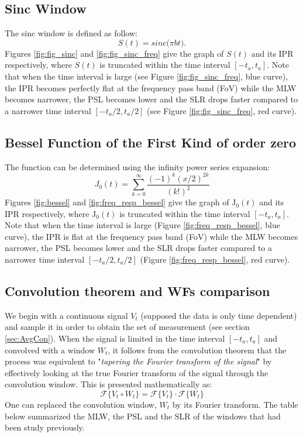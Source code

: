 \documentclass[useAMS,usenatbib]{mn2e}
\begin{document}
\subsection{Sinc Window}
The sinc window is defined as follow:
\begin{equation}
S(t)= sinc\big(\pi b t\big).
\end{equation}
 Figures \ref{fig:fig_sinc} and \ref{fig:fig_sinc_freq} give the graph of $S(t)$ and its IPR respectively, where 
$S(t)$ is truncated within the time interval $[-t_a,t_a]$. Note that when the time interval is large 
(see Figure \ref{fig:fig_sinc_freq}, blue curve), the IPR becomes perfectly flat at the frequency pass band (FoV) while the MLW becomes 
narrower,  the PSL 
becomes lower and the SLR drops faster compared to a narrower time interval $[-t_a/2,t_a/2]$ (see Figure \ref{fig:fig_sinc_freq}, red 
curve). 
\subsection{Bessel Function of the First Kind of order zero}
 The function can  be determined using the infinity power series expansion:
\begin{equation}
J_0(t) = \sum_{k=0}^{\infty}\frac{(-1)^k (x/2)^{2k}}{(k!)^2}
\end{equation}
 Figures \ref{fig:bessel} and  \ref{fig:freq_resp_bessel} give the graph of J$_0(t)$ and its IPR respectively, where 
J$_0(t)$ is truncated within the time interval $[-t_a,t_a]$. Note that when the time interval is large 
(Figure \ref{fig:freq_resp_bessel}, blue curve), the IPR is flat at the frequency pass band (FoV) while the MLW becomes narrower,  the PSL 
becomes lower and the SLR drops faster compared to a narrower time interval $[-t_a/2,t_a/2]$ (Figure \ref{fig:freq_resp_bessel}, red curve).
\subsection{Convolution theorem and WFs comparison}
We begin with a continuous signal $V_{t}$ (supposed the data is only time dependent) and sample it in order to obtain the set of 
measurement (see section \ref{sec:AvgCon}). When the signal is limited in the time interval $[-t_a,t_a]$ and convolved with a window 
$W_{t}$, it 
follows from the convolution theorem that the process was equivalent to "\textit{tapering the  Fourier transform of the signal}" by 
effectively looking at the true Fourier transform of the signal through the convolution window. This is presented mathematically as:
\begin{equation}
\mathcal{F}\Big\{V_{t}\circ W_{t}\Big\} = \mathcal{F}\Big\{V_{t}\Big\}\cdot \mathcal{F}\Big\{W_{t}\Big\}
\end{equation}
One can replaced the convolution window, $W_{t}$ by its Fourier transform. The table below summarized the MLW, the PSL and the SLR of the 
windows that had been study previously.\\
\end{document}
